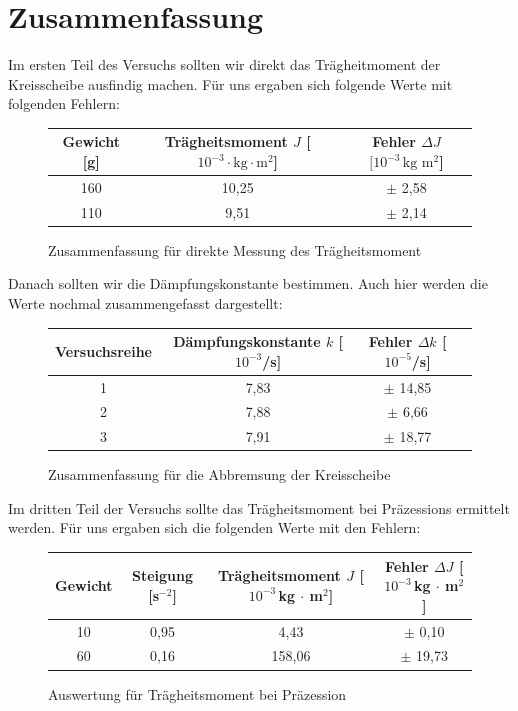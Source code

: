 \documentclass[fontsize=12pt]{scrartcl}
\begin{document}
\newpage
\section{Zusammenfassung}

Im ersten Teil des Versuchs sollten wir direkt das Trägheitmoment der Kreisscheibe ausfindig machen.  Für uns ergaben sich folgende Werte mit folgenden Fehlern: 
\begin{figure}[H]
\centering
\caption{Zusammenfassung für direkte Messung des Trägheitsmoment}
\begin{tabular}{|c|c|c|} \hline
Gewicht [g] & Trägheitsmoment $J$ [$10^{-3}\cdot {{\text{kg} \cdot {\text{m}^2}}}$]  & Fehler $\Delta J$ $[10^{-3}\,\text{kg m$^2$}$]\\ \hline
160 & 10,25 & $\pm$ 2,58   \\ \hline
110 & 9,51 &  $\pm$ 2,14  \\ \hline
\end{tabular}				 
\end{figure}

Danach sollten wir die Dämpfungskonstante bestimmen. Auch hier werden die Werte nochmal zusammengefasst dargestellt:

\begin{figure}[H]
\centering
\caption{Zusammenfassung für die Abbremsung der Kreisscheibe}
\begin{tabular}{|c|c|c|c|} \hline
Versuchsreihe & Dämpfungskonstante $k$ [$10^{-3}$/s]  & Fehler $\Delta k$ [$10^{-5}$/s]\\ \hline
1 & 7,83 & $\pm$ 14,85 \\ \hline
2&  7,88 & $\pm$ 6,66\\ \hline
3& 7,91 & $\pm$	 18,77 \\ \hline
\end{tabular}				 
\end{figure}

Im dritten Teil der Versuchs sollte das Trägheitsmoment bei Präzessions ermittelt werden. 
Für uns ergaben sich die folgenden Werte mit den Fehlern:

\begin{figure}[H]
\centering
\caption{Auswertung für Trägheitsmoment bei Präzession}
\begin{tabular}{|c|c|c|c|} \hline
Gewicht & Steigung [s$^{-2}$]& Trägheitsmoment $J$ [$10^{-3}$\,kg $\cdot$ m$^2$] & Fehler  $\Delta J$ [$10^{-3}$\,kg $\cdot$ m$^2$] \\ \hline
10 & 0,95 & 4,43  &$\pm$ 0,10 \\ \hline
60 & 0,16 & 158,06 &$\pm$  19,73 \\ \hline
\end{tabular}				 
\end{figure}
 
\end{document}
